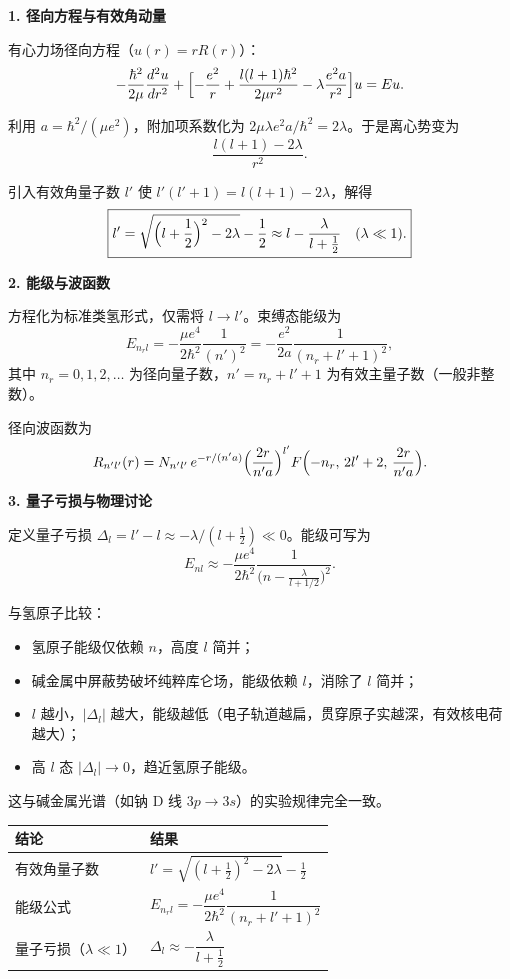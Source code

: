 \begin{derivationbox}[标准解题过程]
\textbf{1. 径向方程与有效角动量}

有心力场径向方程（$u(r)=rR(r)$）：
\[
-\frac{\hbar^2}{2\mu}\frac{d^2u}{dr^2}+\Bigl[-\frac{e^2}{r}+\frac{l(l+1)\hbar^2}{2\mu r^2}-\lambda\frac{e^2a}{r^2}\Bigr]u=Eu.
\]

利用 $a=\hbar^2/(\mu e^2)$，附加项系数化为 $2\mu\lambda e^2a/\hbar^2=2\lambda$。于是离心势变为
\[
\frac{l(l+1)-2\lambda}{r^2}.
\]

引入有效角量子数 $l'$ 使 $l'(l'+1)=l(l+1)-2\lambda$，解得
\begin{equation}
\boxed{l'=\sqrt{\Bigl(l+\frac12\Bigr)^2-2\lambda}-\frac12\approx l-\frac{\lambda}{l+\frac12}\quad(\lambda\ll1).}
\end{equation}

\textbf{2. 能级与波函数}

方程化为标准类氢形式，仅需将 $l\to l'$。束缚态能级为
\begin{equation}
\boxed{E_{n_rl}=-\frac{\mu e^4}{2\hbar^2}\frac{1}{(n')^2}=-\frac{e^2}{2a}\frac{1}{(n_r+l'+1)^2},}
\end{equation}
其中 $n_r=0,1,2,\ldots$ 为径向量子数，$n'=n_r+l'+1$ 为有效主量子数（一般非整数）。

径向波函数为
\[
R_{n'l'}(r)=N_{n'l'}\,e^{-r/(n'a)}\Bigl(\frac{2r}{n'a}\Bigr)^{l'}F\Bigl(-n_r,\,2l'+2,\,\frac{2r}{n'a}\Bigr).
\]

\textbf{3. 量子亏损与物理讨论}

定义量子亏损 $\Delta_l=l'-l\approx-\lambda/(l+\frac12)\ll0$。能级可写为
\[
E_{nl}\approx-\frac{\mu e^4}{2\hbar^2}\frac{1}{\bigl(n-\frac{\lambda}{l+1/2}\bigr)^2}.
\]

与氢原子比较：
\begin{itemize}
    \item 氢原子能级仅依赖 $n$，高度 $l$ 简并；
    \item 碱金属中屏蔽势破坏纯粹库仑场，能级依赖 $l$，消除了 $l$ 简并；
    \item $l$ 越小，$|\Delta_l|$ 越大，能级越低（电子轨道越扁，贯穿原子实越深，有效核电荷越大）；
    \item 高 $l$ 态 $|\Delta_l|\to0$，趋近氢原子能级。
\end{itemize}
这与碱金属光谱（如钠 D 线 $3p\to3s$）的实验规律完全一致。
\end{derivationbox}

\begin{formulabox}[答案汇总]
\begin{center}
\begin{tabular}{ll}
\toprule
\textbf{结论} & \textbf{结果} \\
\midrule
有效角量子数 & $l'=\sqrt{(l+\frac12)^2-2\lambda}-\frac12$ \\
能级公式 & $E_{n_rl}=-\dfrac{\mu e^4}{2\hbar^2}\dfrac{1}{(n_r+l'+1)^2}$ \\
量子亏损（$\lambda\ll1$） & $\Delta_l\approx-\dfrac{\lambda}{l+\frac12}$ \\
\bottomrule
\end{tabular}
\end{center}
\end{formulabox}

